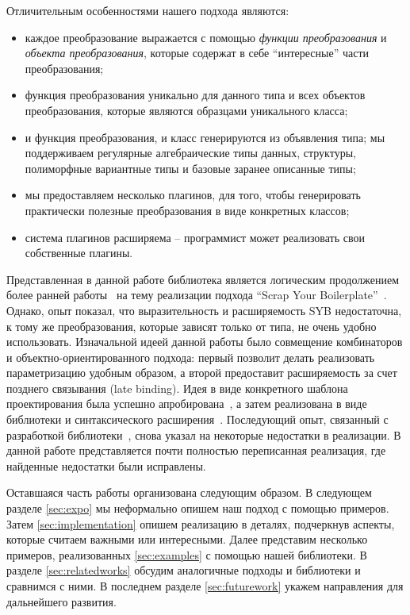 Отличительным особенностями нашего подхода являются:

\begin{itemize}
\item каждое преобразование выражается с помощью \emph{функции преобразования} и \emph{объекта преобразования}, которые содержат в себе ``интересные'' части преобразования;
\item функция преобразования уникально для данного типа и всех объектов преобразования, которые являются образцами уникального класса;
\item и функция преобразования, и класс генерируются из объявления типа; мы поддерживаем регулярные алгебраические типы данных, структуры, полиморфные вариантные типы и базовые заранее описанные типы;
\item мы предоставляем несколько плагинов, для того, чтобы генерировать практически полезные преобразования в виде конкретных классов;
\item система плагинов расширяема -- программист может реализовать свои собственные плагины.
\end{itemize}

Представленная в данной работе библиотека является логическим продолжением более ранней работы~\cite{SYBOCaml} на тему реализации подхода ``Scrap Your Boilerplate''~\cite{SYB,SYB1,SYB2}. Однако, опыт показал, что выразительность и расширяемость SYB недостаточна, к тому же преобразования, которые зависят только от типа, не очень удобно использовать. Изначальной идеей данной работы было совмещение комбинаторов и объектно-ориентированного подхода: первый позволит делать реализовать параметризацию удобным образом, а второй предоставит расширяемость за счет позднего связывания (late binding). Идея в виде конкретного шаблона проектирования была успешно апробирована~\cite{SCICO}, а затем реализована в виде библиотеки и синтаксического расширения~\cite{TransformationObjects}. Последующий опыт, связанный с разработкой библиотеки~\cite{OCanren}, снова указал на некоторые недостатки в реализации. В данной работе представляется почти полностью переписанная реализация, где найденные недостатки были исправлены.

Оставшаяся часть работы организована следующим образом. В следующем разделе \ref{sec:expo} мы неформально опишем наш подход с помощью примеров. Затем \ref{sec:implementation} опишем реализацию в деталях, подчеркнув аспекты, которые считаем важными или интересными. Далее представим несколько примеров, реализованных \ref{sec:examples} с помощью нашей библиотеки. В разделе \ref{sec:relatedworks} обсудим аналогичные подходы и библиотеки и сравнимся с ними. В последнем разделе \ref{sec:futurework} укажем направления для дальнейшего развития.


